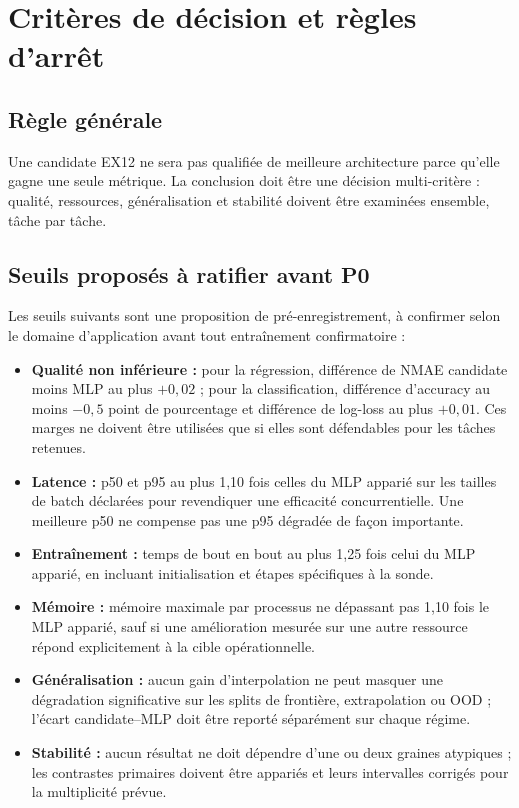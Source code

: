 \documentclass[11pt,a4paper]{article}
\begin{document}
\section{Critères de décision et règles d'arrêt}

\subsection{Règle générale}

Une candidate EX12 ne sera pas qualifiée de meilleure architecture parce qu'elle gagne une seule métrique. La conclusion doit être une décision multi-critère : qualité, ressources, généralisation et stabilité doivent être examinées ensemble, tâche par tâche.

\subsection{Seuils proposés à ratifier avant P0}

Les seuils suivants sont une proposition de pré-enregistrement, à confirmer selon le domaine d'application avant tout entraînement confirmatoire :
\begin{itemize}
  \item \textbf{Qualité non inférieure :} pour la régression, différence de NMAE candidate moins MLP au plus $+0,02$ ; pour la classification, différence d'accuracy au moins $-0,5$ point de pourcentage et différence de log-loss au plus $+0,01$. Ces marges ne doivent être utilisées que si elles sont défendables pour les tâches retenues.
  \item \textbf{Latence :} p50 et p95 au plus 1,10 fois celles du MLP apparié sur les tailles de batch déclarées pour revendiquer une efficacité concurrentielle. Une meilleure p50 ne compense pas une p95 dégradée de façon importante.
  \item \textbf{Entraînement :} temps de bout en bout au plus 1,25 fois celui du MLP apparié, en incluant initialisation et étapes spécifiques à la sonde.
  \item \textbf{Mémoire :} mémoire maximale par processus ne dépassant pas 1,10 fois le MLP apparié, sauf si une amélioration mesurée sur une autre ressource répond explicitement à la cible opérationnelle.
  \item \textbf{Généralisation :} aucun gain d'interpolation ne peut masquer une dégradation significative sur les splits de frontière, extrapolation ou OOD ; l'écart candidate--MLP doit être reporté séparément sur chaque régime.
  \item \textbf{Stabilité :} aucun résultat ne doit dépendre d'une ou deux graines atypiques ; les contrastes primaires doivent être appariés et leurs intervalles corrigés pour la multiplicité prévue.
\end{itemize}
\end{document}
